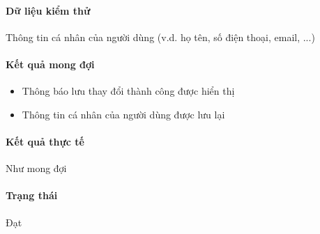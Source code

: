 \documentclass[./../main.tex]{subfiles}
\begin{document}
\paragraph*{Dữ liệu kiểm thử} Thông tin cá nhân của người dùng (v.d. họ tên, số điện thoại, email, ...)

\paragraph*{Kết quả mong đợi}

\begin{itemize}
    \item Thông báo lưu thay đổi thành công được hiển thị
    \item Thông tin cá nhân của người dùng được lưu lại
\end{itemize}

\paragraph*{Kết quả thực tế} Như mong đợi

\paragraph*{Trạng thái} Đạt
\end{document}
